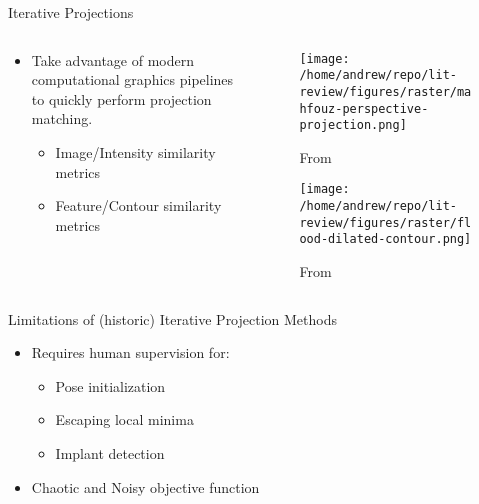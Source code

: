 \documentclass[presentation, aspectratio=1610]{beamer}
\begin{document}
\begin{frame}[label={sec:orgb8017e8}]{Iterative Projections}
\begin{columns}
\begin{column}{0.54\columnwidth}
\begin{itemize}
\item Take advantage of modern computational graphics pipelines to quickly perform projection matching.
\begin{itemize}
\item Image/Intensity similarity metrics \autocite{mahfouzRobustMethodRegistration2003}
\item Feature/Contour similarity metrics \autocite{floodAutomatedRegistration3D2018}
\end{itemize}
\end{itemize}
\end{column}
\begin{column}{0.6\columnwidth}
\begin{figure}[htbp]
\centering
\texttt{[image: /home/andrew/repo/lit-review/figures/raster/mahfouz-perspective-projection.png]}
\caption{From \autocite{mahfouzRobustMethodRegistration2003}}
\end{figure}
\begin{figure}[htbp]
\centering
\texttt{[image: /home/andrew/repo/lit-review/figures/raster/flood-dilated-contour.png]}
\caption{From \autocite{floodAutomatedRegistration3D2018}}
\end{figure}
\end{column}
\end{columns}
\end{frame}
\begin{frame}[label={sec:orgf4b3b2b}]{Limitations of (historic) Iterative Projection Methods}
\begin{itemize}
\item Requires human supervision for:
\begin{itemize}
\item Pose initialization
\item Escaping local minima
\item Implant detection
\end{itemize}
\item Chaotic and Noisy objective function
\end{itemize}
\end{frame}
\end{document}
